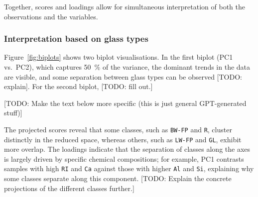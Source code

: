 \documentclass[dtu]{dtuarticle}
\newcommand{\todo}[1]{\color{red}[TODO: #1]\color{black}}
\begin{document}
	Together, scores and loadings allow for simultaneous interpretation of both the observations and the variables.

	\subsubsection{Interpretation based on glass types}

	Figure~\ref{fig:biplots} shows two biplot visualisations. In the first biplot (PC1 vs.\ PC2), which captures \SI{50}{\percent} of the variance, the dominant trends in the data are visible, and some separation between glass types can be observed \todo{explain}. For the second biplot, \todo{fill out.}

	\todo{Make the text below more specific (this is just general GPT-generated stuff)}

	The projected scores reveal that some classes, such as \texttt{BW-FP} and \texttt{R}, cluster distinctly in the reduced space, whereas others, such as \texttt{LW-FP} and \texttt{GL}, exhibit more overlap. The loadings indicate that the separation of classes along the axes is largely driven by specific chemical compositions; for example, PC1 contrasts samples with high \texttt{RI} and \texttt{Ca} against those with higher \texttt{Al} and \texttt{Si}, explaining why some classes separate along this component. \todo{Explain the concrete projections of the different classes further.}
\end{document}
